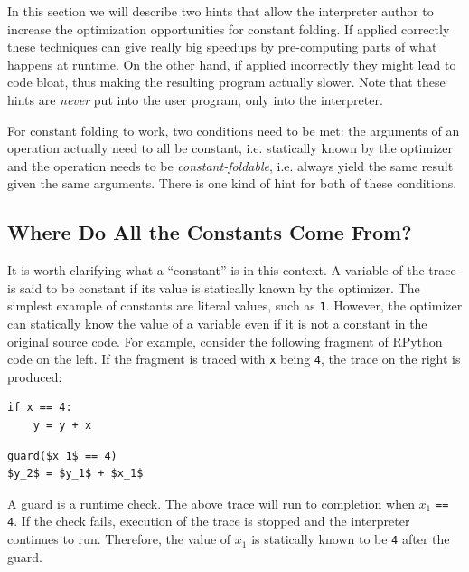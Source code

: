 \documentclass{sigplanconf}
\newcommand{\noop}{}
\begin{document}
In this section we will describe two hints that allow the
interpreter author to increase the optimization opportunities for constant
folding.
If applied correctly these techniques can give really big speedups by
pre-computing parts of what happens at runtime. On the other
hand, if applied incorrectly they might lead to code bloat, thus making the
resulting program actually slower. Note that these hints are \emph{never} put into the user program, only into the interpreter.

For constant folding to work, two conditions need to be met: the arguments of
an operation actually need to all be constant, i.e. statically known by the
optimizer and the operation needs to be \emph{constant-foldable}, i.e. always
yield the same result given the same arguments.
There is one kind of hint for both of these conditions.


\subsection{Where Do All the Constants Come From?}

It is worth clarifying what a ``constant'' is in this context.  A variable of
the trace is said to be constant if its value is statically known by the
optimizer.
The simplest example of constants are literal values, such as \texttt{1}.
However, the optimizer can statically know the value of a variable even if it
is not a constant in the original source code. For example, consider the
following fragment of RPython code on the left. If the fragment is traced with
\texttt{x} being \texttt{4}, the trace on the right is produced:


\begin{minipage}[b]{0.5\linewidth}
\centering
{\noop
\begin{lstlisting}[mathescape,basicstyle=\ttfamily]
if x == 4:
    y = y + x
\end{lstlisting}
}
\end{minipage}
\vline
\hspace{0.5cm}
\begin{minipage}[b]{0.5\linewidth}
{\noop
\begin{lstlisting}[mathescape,basicstyle=\ttfamily]
guard($x_1$ == 4)
$y_2$ = $y_1$ + $x_1$
\end{lstlisting}
}
\end{minipage}


A guard is a runtime check. The above trace will run to completion when $x_1$
\texttt{== 4}. If the check fails, execution of the trace is stopped and the
interpreter continues to run. Therefore, the value of $x_1$ is statically known
to be \texttt{4} after the guard.
\end{document}
